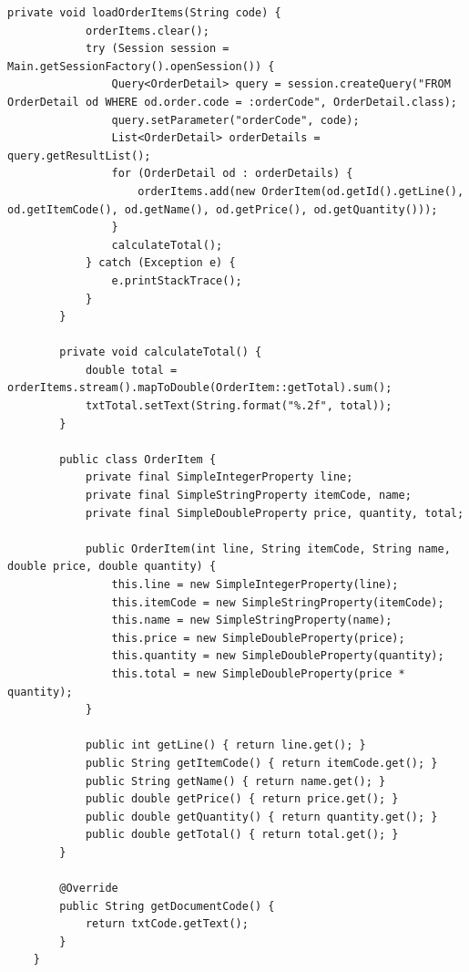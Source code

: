 \begin{lstlisting}[style=JavaStyle]
		private void loadOrderItems(String code) {
			orderItems.clear();
			try (Session session = Main.getSessionFactory().openSession()) {
				Query<OrderDetail> query = session.createQuery("FROM OrderDetail od WHERE od.order.code = :orderCode", OrderDetail.class);
				query.setParameter("orderCode", code);
				List<OrderDetail> orderDetails = query.getResultList();
				for (OrderDetail od : orderDetails) {
					orderItems.add(new OrderItem(od.getId().getLine(), od.getItemCode(), od.getName(), od.getPrice(), od.getQuantity()));
				}
				calculateTotal();
			} catch (Exception e) {
				e.printStackTrace();
			}
		}
		
		private void calculateTotal() {
			double total = orderItems.stream().mapToDouble(OrderItem::getTotal).sum();
			txtTotal.setText(String.format("%.2f", total));
		}
		
		public class OrderItem {
			private final SimpleIntegerProperty line;
			private final SimpleStringProperty itemCode, name;
			private final SimpleDoubleProperty price, quantity, total;
			
			public OrderItem(int line, String itemCode, String name, double price, double quantity) {
				this.line = new SimpleIntegerProperty(line);
				this.itemCode = new SimpleStringProperty(itemCode);
				this.name = new SimpleStringProperty(name);
				this.price = new SimpleDoubleProperty(price);
				this.quantity = new SimpleDoubleProperty(quantity);
				this.total = new SimpleDoubleProperty(price * quantity);
			}
			
			public int getLine() { return line.get(); }
			public String getItemCode() { return itemCode.get(); }
			public String getName() { return name.get(); }
			public double getPrice() { return price.get(); }
			public double getQuantity() { return quantity.get(); }
			public double getTotal() { return total.get(); }
		}
		
		@Override
		public String getDocumentCode() {
			return txtCode.getText();
		}
	}
\end{lstlisting}

